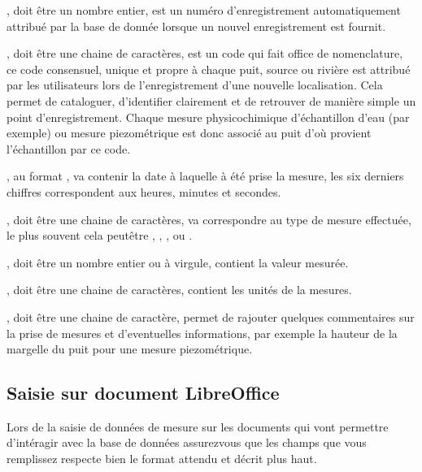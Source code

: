\documentclass[letterpaper,10pt,french]{sphinxmanual}
\begin{document}
\sphinxAtStartPar
{}, doit être un nombre entier, est un numéro d’enregistrement automatiquement attribué par la base de donnée lorsque un nouvel enregistrement est fournit.

\sphinxAtStartPar
{}, doit être une chaine de caractères, est un code qui fait office de nomenclature, ce code consensuel, unique et propre à chaque puit, source ou rivière est attribué par les utilisateurs
lors de l’enregistrement d’une nouvelle localisation. Cela permet de cataloguer, d’identifier clairement et de retrouver de manière simple un point d’enregistrement.
Chaque mesure physico\sphinxhyphen{}chimique d’échantillon d’eau (par exemple) ou mesure piezométrique est donc associé au puit d’où provient l’échantillon par ce code.

\sphinxAtStartPar
{}, au format , va contenir la date à laquelle à été prise la mesure, les six derniers chiffres correspondent aux heures, minutes et secondes.

\sphinxAtStartPar
{}, doit être une chaine de caractères, va correspondre au type de mesure effectuée, le plus souvent cela peut\sphinxhyphen{}être , , ,  ou .

\sphinxAtStartPar
{}, doit être un nombre entier ou à virgule, contient la valeur mesurée.

\sphinxAtStartPar
{}, doit être une chaine de caractères, contient les unités de la mesures.

\sphinxAtStartPar
{}, doit être une chaine de caractère, permet de rajouter quelques commentaires sur la prise de mesures et d’eventuelles informations, par exemple la hauteur de
la margelle du puit pour une mesure piezométrique.


\subsection{Saisie sur document LibreOffice}
\label{\detokenize{bones:saisie-sur-document-libreoffice}}
\sphinxAtStartPar
Lors de la saisie de données de mesure sur les documents  qui vont permettre d’intéragir avec la base de données assurez\sphinxhyphen{}vous que les champs que vous remplissez
respecte bien le format attendu et décrit plus haut.
\end{document}
